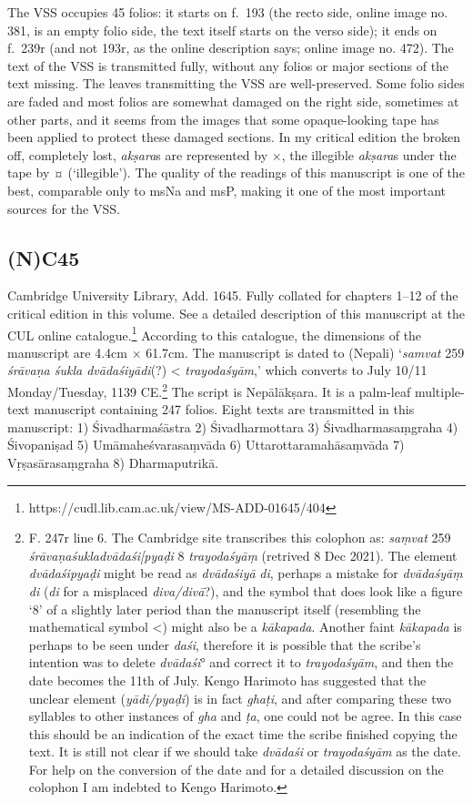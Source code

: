 \documentclass[]{article}
\begin{document}
The VSS occupies 45 folios: it starts on f.~193 (the recto side, online
image no. 381, is an empty folio side, the text itself starts on the
verso side); it ends on f.~239r (and not 193r, as the online description
says; online image no. 472). The text of the VSS is transmitted fully,
without any folios or major sections of the text missing. The leaves
transmitting the VSS are well-preserved. Some folio sides are faded and
most folios are somewhat damaged on the right side, sometimes at other
parts, and it seems from the images that some opaque-looking tape has
been applied to protect these damaged sections. In my critical edition
the broken off, completely lost, \emph{akṣara}s are represented by ×,
the illegible \emph{akṣara}s under the tape by ¤ (`illegible'). The
quality of the readings of this manuscript is one of the best,
comparable only to msNa and msP, making it one of the most important
sources for the VSS.

\hypertarget{nc45}{%
\subsection{(N)C45}\label{nc45}}

Cambridge University Library, Add. 1645. Fully collated for chapters
1--12 of the critical edition in this volume. See a detailed description
of this manuscript at the CUL online catalogue.\footnote{https://cudl.lib.cam.ac.uk/view/MS-ADD-01645/404}
According to this catalogue, the dimensions of the manuscript are 4.4cm
× 61.7cm. The manuscript is dated to (Nepali) `\emph{samvat} 259
\emph{śrāvaṇa śukla dvādaśiyādi}(?) \textless{} \emph{trayodaśyām},'
which converts to July 10/11 Monday/Tuesday, 1139 CE.\footnote{F. 247r
  line 6. The Cambridge site transcribes this colophon as: \emph{saṃvat}
  259 \emph{śrāvaṇaśukladvādaśi{[}pyaḍi} 8 \emph{trayodaśyāṃ} (retrived
  8 Dec 2021). The element \emph{dvādaśipyaḍi} might be read as
  \emph{dvādaśiyā} \emph{di}, perhaps a mistake for \emph{dvādaśyāṃ}
  \emph{di} (\emph{di} for a misplaced \emph{diva/divā}?), and the
  symbol that does look like a figure `8' of a slightly later period
  than the manuscript itself (resembling the mathematical symbol
  \textless{}) might also be a \emph{kākapada}. Another faint
  \emph{kākapada} is perhaps to be seen under \emph{daśi}, therefore it
  is possible that the scribe's intention was to delete \emph{dvādaśi}°
  and correct it to \emph{trayodaśyām}, and then the date becomes the
  11th of July. Kengo Harimoto has suggested that the unclear element
  (\emph{yādi/pyaḍi}) is in fact \emph{ghaṭi}, and after comparing these
  two syllables to other instances of \emph{gha} and \emph{ṭa}, one
  could not be agree. In this case this should be an indication of the
  exact time the scribe finished copying the text. It is still not clear
  if we should take \emph{dvādaśi} or \emph{trayodaśyām} as the date.
  For help on the conversion of the date and for a detailed discussion
  on the colophon I am indebted to Kengo Harimoto.} The script is
Nepālākṣara. It is a palm-leaf multiple-text manuscript containing 247
folios. Eight texts are transmitted in this manuscript: 1)
Śivadharmaśāstra 2) Śivadharmottara 3) Śivadharmasaṃgraha 4) Śivopaniṣad
5) Umāmaheśvarasaṃvāda 6) Uttarottaramahāsaṃvāda 7) Vṛṣasārasaṃgraha 8)
Dharmaputrikā.
\end{document}
